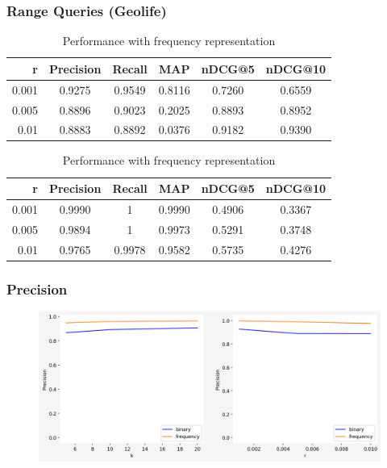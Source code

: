 \documentclass{beamer}
\begin{document}
\begin{frame}
\frametitle{Range Queries (Geolife)} 
\begin{block}{} \vspace{-3mm}
\begin{table}[!htbp]
{\footnotesize
\centering
\begin{tabular}{rccccc}
 	{\bf r } 	& {\bf Precision}& {\bf Recall}	&	{\bf MAP}	 & {\bf nDCG@5}	& {\bf nDCG@10} \\ \midrule
  	0.001   	& 	0.9275    	& 	0.9549 	&	0.8116	& 0.7260		& 0.6559	\\ \midrule
	0.005   	& 	0.8896    	& 	0.9023 	&	0.2025	& 0.8893		& 0.8952	\\ \midrule
 	0.01	 	&   	0.8883   	&      0.8892	&	0.0376	& 0.9182  		& 0.9390	\\ \bottomrule
\end{tabular} 
\caption{\footnotesize Performance with binary representation} \vspace{3mm}

\centering
\begin{tabular}{rccccc}
 	{\bf r } 	& {\bf Precision}& {\bf Recall}	&	{\bf MAP}	 & {\bf nDCG@5}	& {\bf nDCG@10} \\ \midrule
  	0.001   	& 	0.9990    	& 	1		&	0.9990	 & 0.4906			& 0.3367	\\ \midrule
	0.005   	& 	0.9894    	& 	1		&	0.9973	 & 0.5291			& 0.3748	\\ \midrule
 	0.01	 	&   	0.9765   	&      0.9978	&	0.9582	 & 0.5735  			& 0.4276	\\ \bottomrule
\end{tabular} 
\caption{\footnotesize Performance with frequency representation}
\label{table: Geolife multipass} 
}
\end{table}
\end{block}
\end{frame}



\begin{frame}
\frametitle{Precision} 
\begin{block}{} \vspace{-1cm}
\begin{figure}[h] 
\includegraphics[width=1 \textwidth]{Precision-Geolife} 
\end{figure}
\end{block}
\end{frame}
\end{document}
